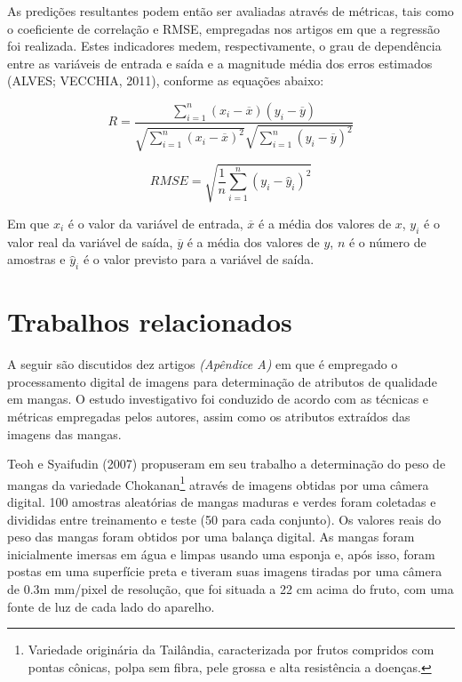 As predições resultantes podem então ser avaliadas através de métricas, tais como o coeficiente de correlação e RMSE, empregadas nos artigos em que a regressão foi realizada. Estes indicadores medem, respectivamente, o grau de dependência entre as variáveis de entrada e saída e a magnitude média dos erros estimados (ALVES; VECCHIA, 2011), conforme as equações abaixo:

\begin{equation} \label{eq:r}
	R = \frac{\sum_{i=1}^n (x_i - \overline{x})(y_i - \overline{y})}{\sqrt{\sum_{i=1}^n(x_i - \overline{x})^2} \sqrt{\sum_{i=1}^n (y_i - \overline{y})^2}}
\end{equation}

\begin{equation} \label{eq:rmse}
	RMSE = \sqrt{\frac{1}{n} \sum_{i=1}^n (y_i - \hat{y}_i)^2}
\end{equation}

Em que $x_i$ é o valor da variável de entrada, $\overline{x}$ é a média dos valores de $x$, $y_i$ é o valor real da variável de saída, $\overline{y}$ é a média dos valores de $y$, $n$ é o número de amostras e $\hat{y}_i$ é o valor previsto para a variável de saída.

\section{Trabalhos relacionados}

A seguir são discutidos dez artigos \textit{(Apêndice A)} em que é empregado o processamento digital de imagens para determinação de atributos de qualidade em mangas. O estudo investigativo foi conduzido de acordo com as técnicas e métricas empregadas pelos autores, assim como os atributos extraídos das imagens das mangas. 

Teoh e Syaifudin (2007) propuseram em seu trabalho a determinação do peso de mangas da variedade Chokanan\footnote{\label{ftnote:chokanan}Variedade originária da Tailândia, caracterizada por frutos compridos com pontas cônicas, polpa sem fibra, pele grossa e alta resistência a doenças.} através de imagens obtidas por uma câmera digital. 100 amostras aleatórias de mangas maduras e verdes foram coletadas e divididas entre treinamento e teste (50 para cada conjunto). Os valores reais do peso das mangas foram obtidos por uma balança digital. As mangas foram inicialmente imersas em água e limpas usando uma esponja e, após isso, foram postas em uma superfície preta e tiveram suas imagens tiradas por uma câmera de 0.3m mm/pixel de resolução, que foi situada a 22 cm acima do fruto, com uma fonte de luz de cada lado do aparelho. 

